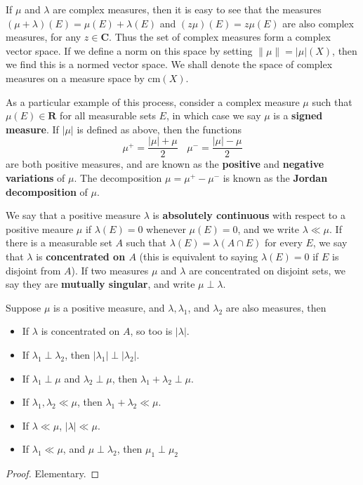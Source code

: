 If $\mu$ and $\lambda$ are complex measures, then it is easy to see that the measures $(\mu + \lambda)(E) = \mu(E) + \lambda(E)$ and $(z \mu)(E) = z \mu(E)$ are also complex measures, for any $z \in \mathbf{C}$. Thus the set of complex measures form a complex vector space. If we define a norm on this space by setting $\| \mu \| = |\mu|(X)$, then we find this is a normed vector space. We shall denote the space of complex measures on a measure space by $\text{cm}(X)$.

As a particular example of this process, consider a complex measure $\mu$ such that $\mu(E) \in \mathbf{R}$ for all measurable sets $E$, in which case we say $\mu$ is a {\bf signed measure}. If $|\mu|$ is defined as above, then the functions
%
\[ \mu^+ = \frac{|\mu| + \mu}{2}\ \ \ \ \mu^- = \frac{|\mu| - \mu}{2} \]
%
are both positive measures, and are known as the {\bf positive} and {\bf negative variations} of $\mu$. The decomposition $\mu = \mu^+ - \mu^-$ is known as the {\bf Jordan decomposition} of $\mu$.

We say that a positive measure $\lambda$ is {\bf absolutely continuous} with respect to a positive meaure $\mu$ if $\lambda(E) = 0$ whenever $\mu(E) = 0$, and we write $\lambda \ll \mu$. If there is a measurable set $A$ such that $\lambda(E) = \lambda(A \cap E)$ for every $E$, we say that $\lambda$ is {\bf concentrated on $A$} (this is equivalent to saying $\lambda(E) = 0$ if $E$ is disjoint from $A$). If two measures $\mu$ and $\lambda$ are concentrated on disjoint sets, we say they are {\bf mutually singular}, and write $\mu \perp \lambda$.

\begin{theorem}
    Suppose $\mu$ is a positive measure, and $\lambda, \lambda_1$, and $\lambda_2$ are also measures, then
    \begin{itemize}
        \item If $\lambda$ is concentrated on $A$, so too is $|\lambda|$.
        \item If $\lambda_1 \perp \lambda_2$, then $|\lambda_1| \perp |\lambda_2|$.
        \item If $\lambda_1 \perp \mu$ and $\lambda_2 \perp \mu$, then $\lambda_1 + \lambda_2 \perp \mu$.
        \item If $\lambda_1, \lambda_2 \ll \mu$, then $\lambda_1 + \lambda_2 \ll \mu$.
        \item If $\lambda \ll \mu$, $|\lambda| \ll \mu$.
        \item If $\lambda_1 \ll \mu$, and $\mu \perp \lambda_2$, then $\mu_1 \perp \mu_2$
    \end{itemize}
\end{theorem}
\begin{proof}
    Elementary.
\end{proof}

